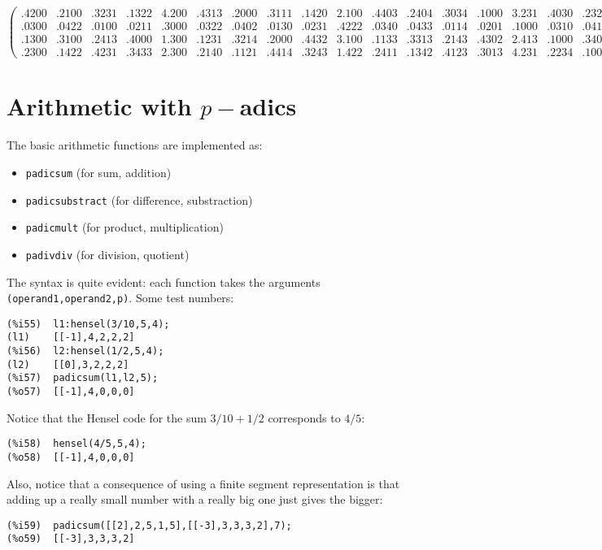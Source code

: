 \documentclass[fleqn]{cas-sc}
\begin{document}
\begin{sideways}
\begin{minipage}{\textheight}
\[\begin{pmatrix}
.4200 & .2100 & .3231 & .1322 & 4.200 & .4313 & .2000 & .3111 & .1420 & 2.100 & .4403 & .2404 & .3034 & .1000 & 3.231 & .4030 & .2323\\
.0300 & .0422 & .0100 & .0211 & .3000 & .0322 & .0402 & .0130 & .0231 & .4222 & .0340 & .0433 & .0114 & .0201 & .1000 & .0310 & .0412\\
.1300 & .3100 & .2413 & .4000 & 1.300 & .1231 & .3214 & .2000 & .4432 & 3.100 & .1133 & .3313 & .2143 & .4302 & 2.413 & .1000 & .3401\\
.2300 & .1422 & .4231 & .3433 & 2.300 & .2140 & .1121 & .4414 & .3243 & 1.422 & .2411 & .1342 & .4123 & .3013 & 4.231 & .2234 & .1000
\end{pmatrix}
\]
\end{minipage}
\end{sideways}


\section{Arithmetic with $p-$adics}\label{sec4}

\noindent The basic arithmetic functions are implemented as:
\begin{itemize}
	\item  \texttt{padicsum} (for sum, addition)
	\item  \texttt{padicsubstract} (for difference, substraction)
	\item  \texttt{padicmult} (for product, multiplication)
	\item  \texttt{padivdiv} (for division, quotient)
\end{itemize}

The syntax is quite evident: each function takes the arguments
\texttt{(operand1,operand2,p)}.
Some test numbers:
\begin{verbatim}
(%i55)	l1:hensel(3/10,5,4);
(l1)	[[-1],4,2,2,2]
(%i56)	l2:hensel(1/2,5,4);
(l2)	[[0],3,2,2,2]
(%i57)	padicsum(l1,l2,5);
(%o57)	[[-1],4,0,0,0]
\end{verbatim}

Notice that the Hensel code for the sum $3/10+1/2$ corresponds to $4/5$:
\begin{verbatim}
(%i58)	hensel(4/5,5,4);
(%o58)	[[-1],4,0,0,0]
\end{verbatim}

Also, notice that a consequence of using a finite segment representation is that
adding up a really small number with a really big one just gives the bigger:
\begin{verbatim}
(%i59)	padicsum([[2],2,5,1,5],[[-3],3,3,3,2],7);
(%o59)	[[-3],3,3,3,2]
\end{verbatim}
\end{document}
